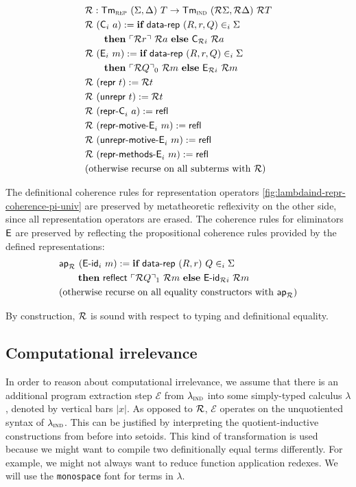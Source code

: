 \begin{align*}
  & \mathcal{R} : \textsf{Tm}_{\textsc{rep}}\ (\Sigma, \Delta)\ T \to \textsf{Tm}_{\textsc{ind}}\ (\mathcal{R} \Sigma, \mathcal{R} \Delta)\ \mathcal{R} T \\
  & \mathcal{R}\ (\textsf{C}_i\ a) := \textbf{if}\ \textsf{data-rep}\ (R, r, Q) \in_i \Sigma\ \\
    &\qquad \textbf{then}\ \ulcorner \mathcal{R} r \urcorner\ \mathcal{R} a\ \textbf{else}\ \textsf{C}_{\mathcal{R} i}\ \mathcal{R} a \\
  & \mathcal{R}\ (\textsf{E}_i\ m) :=  \textbf{if}\ \textsf{data-rep}\ (R, r, Q) \in_i \Sigma\ \\
    &\qquad \textbf{then}\ \ulcorner \mathcal{R} Q \urcorner_0\ \mathcal{R} m\ \textbf{else}\ \textsf{E}_{\mathcal{R} i}\ \mathcal{R} m \\
  & \mathcal{R}\ (\textsf{repr}\ t) := \mathcal{R} t \\
  & \mathcal{R}\ (\textsf{unrepr}\ t) := \mathcal{R} t \\
  & \mathcal{R}\ (\textsf{repr-C}_i\ a) := \textsf{refl} \\
  & \mathcal{R}\ (\textsf{repr-motive-E}_i\ m) := \textsf{refl} \\
  & \mathcal{R}\ (\textsf{unrepr-motive-E}_i\ m) := \textsf{refl} \\
  & \mathcal{R}\ (\textsf{repr-methods-E}_i\ m) := \textsf{refl} \\
  & \text{(otherwise recurse on all subterms with $\mathcal{R}$)}
\end{align*}

The definitional coherence rules for representation operators
\cref{fig:lambdaind-repr-coherence-pi-univ} are preserved by metatheoretic
reflexivity on the other side, since all representation operators are erased.
The coherence rules for eliminators $\textsf{E}$ are preserved by reflecting the
propositional coherence rules provided by the defined representations:
\begin{align*}
& \mta{ap}_\R\ (\mta{E-id}_i\ m) :=  \kwd{if}\ \mta{data-rep}\ (R, r)\ Q \in_i \Sigma\ \\
      &\qquad \kwd{then}\ \mta{reflect}\ \emb{\R Q}_1\ \R m\ \kwd{else}\ \mta{E-id}_{\R i}\ \R m  \\
& \text{(otherwise recurse on all equality constructors with $\mta{ap}_\R$)}
\end{align*}

By construction, $\mathcal{R}$ is sound with respect to typing and definitional equality.

\subsection{Computational irrelevance}

In order to reason about computational irrelevance, we assume that there is
an additional program extraction step $\mathcal{E}$ from $\lambda_{\textsc{ind}}$ into some
simply-typed calculus $\lambda$, denoted by vertical bars $|x|$. As opposed to
$\mathcal{R}$, $\mathcal{E}$ operates on the unquotiented syntax of $\lambda_{\textsc{ind}}$. This
can be justified by interpreting the quotient-inductive constructions from
before into setoids. This kind of
transformation is used because we might want to compile two definitionally equal
terms differently. For example, we might not always want to reduce function
application redexes. We will use the \texttt{monospace} font for terms in
$\lambda$.

